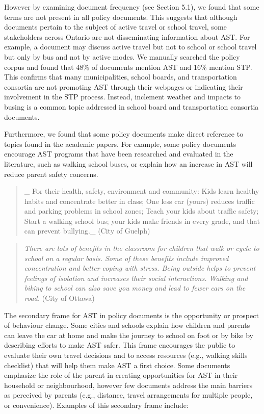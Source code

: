 \documentclass[]{elsarticle} %
\begin{document}
However by examining document frequency (see Section 5.1), we found that
some terms are not present in all policy documents. This suggests that
although documents pertain to the subject of active travel or school
travel, some stakeholders across Ontario are not disseminating
information about AST. For example, a document may discuss active travel
but not to school or school travel but only by bus and not by active
modes. We manually searched the policy corpus and found that 48\% of
documents mention AST and 16\% mention STP. This confirms that many
municipalities, school boards, and transportation consortia are not
promoting AST through their webpages or indicating their involvement in
the STP process. Instead, inclement weather and impacts to busing is a
common topic addressed in school board and transportation consortia
documents.

Furthermore, we found that some policy documents make direct reference
to topics found in the academic papers. For example, some policy
documents encourage AST programs that have been researched and evaluated
in the literature, such as walking school buses, or explain how an
increase in AST will reduce parent safety concerns.

\begin{quote}
\_ For their health, safety, environment and community: Kids learn
healthy habits and concentrate better in class; One less car (yours)
reduces traffic and parking problems in school zones; Teach your kids
about traffic safety; Start a walking school bus; your kids make friends
in every grade, and that can prevent bullying.\_ (City of Guelph)
\end{quote}

\begin{quote}
\emph{There are lots of benefits in the classroom for children that walk
or cycle to school on a regular basis. Some of these benefits include
improved concentration and better coping with stress. Being outside
helps to prevent feelings of isolation and increases their social
interactions. Walking and biking to school can also save you money and
lead to fewer cars on the road.} (City of Ottawa)
\end{quote}

The secondary frame for AST in policy documents is the opportunity or
prospect of behaviour change. Some cities and schools explain how
children and parents can leave the car at home and make the journey to
school on foot or by bike by describing efforts to make AST safer. This
frame encourages the public to evaluate their own travel decisions and
to access resources (e.g., walking skills checklist) that will help them
make AST a first choice. Some documents emphasize the role of the parent
in creating opportunities for AST in their household or neighbourhood,
however few documents address the main barriers as perceived by parents
(e.g., distance, travel arrangements for multiple people, or
convenience). Examples of this secondary frame include:
\end{document}
